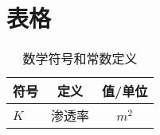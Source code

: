 \chapter{表格}


\begin{table}
	\centering
	\caption{数学符号和常数定义}
	\label{tab:append_Symbols_Values}
	\begin{tabular}{lcc}
		\toprule
		符号 & 定义 & 值/单位\tabularnewline
		\midrule
		$K$ & 渗透率 & $m^2$\\
		\bottomrule
	\end{tabular}
\end{table}

